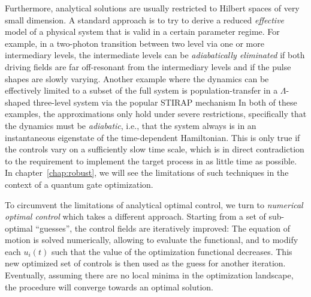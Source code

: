 Furthermore, analytical solutions are usually restricted to Hilbert spaces of very
small dimension. A standard approach is to try to derive a
reduced \emph{effective} model of a physical system that is valid in a certain
parameter regime. For example, in a two-photon transition between two level via
one or more intermediary levels, the intermediate levels can be
\emph{adiabatically eliminated} if both driving fields are far off-resonant
from the intermediary levels and if the pulse shapes are slowly varying. Another
example where the dynamics can be effectively limited to a subset
of the full system is population-transfer in a $\Lambda$-shaped
three-level system via the popular STIRAP mechanism
\cite{VitanovARPC2001}
In both of these examples, the approximations only hold under severe
restrictions, specifically that the dynamics
must be \emph{adiabatic}, i.e., that the system always is in an instantaneous
eigenstate of the time-dependent Hamiltonian.
This is only true if the controls vary on a sufficiently slow time scale, which
is in direct contradiction to the requirement to implement the target process
in as little time as possible.
In chapter~\ref{chap:robust}, we will see the limitations of such techniques in
the context of a quantum gate optimization.

To circumvent the limitations of analytical optimal control, we turn to
\emph{numerical optimal control}
which takes a different approach.  Starting from a set of sub-optimal
``guesses'', the control fields are
iteratively improved: The equation of motion is solved numerically, allowing
to evaluate the functional, and to modify each
$u_i(t)$ such that the value of the optimization functional decreases. This new
optimized set of controls is then used as the guess for another iteration.
Eventually, assuming there are no local minima in the optimization landscape,
the procedure will converge towards an optimal solution.

